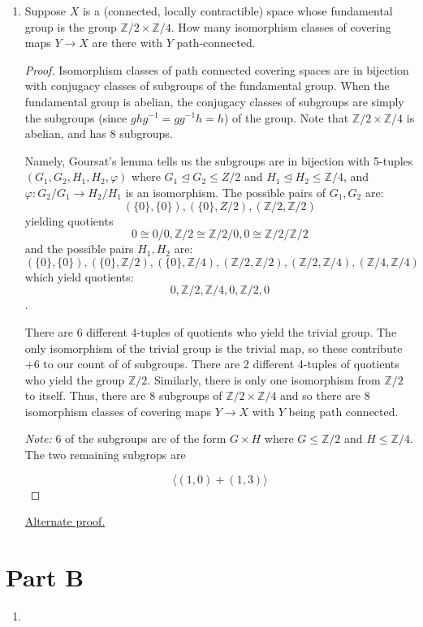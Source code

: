 \documentclass{article}
\newcommand{\Z}{\mathbb{Z}}
\begin{document}
\begin{enumerate}
\begin{proof}{(From \href{https://math.stackexchange.com/questions/202447/retraction-of-the-m\%C3\%B6bius-strip-to-its-boundary}{StackExchange})}
	If there were a retraction $r: M \rightarrow \partial M$, then the induced homomorphism $r_*$ on fundamental groups would satisfy $r_*\circ \iota_* (\alpha) = \alpha$. But $\iota_*(\alpha) = \beta^2$, so then $r_*(\beta^2) = r_*(\beta)^2 = \alpha$, or $r_*(\beta) = \sqrt{\alpha} \not \in \pi_1(\partial M)$.
	\end{proof}
	
	\item Suppose $X$ is a (connected, locally contractible) space whose fundamental group is the group $\mathbb{Z}/2 \times \mathbb{Z}/4.$
	How many isomorphism classes of covering maps $Y \rightarrow X$ are there with $Y$ path-connected.
	
	\begin{proof}
		Isomorphism classes of path connected covering spaces are in bijection with conjugacy classes of subgroups of the fundamental group. 
		When the fundamental group is abelian, the conjugacy classes of subgroups are simply 
		the subgroups (since $ghg^{-1} = gg^{-1} h=h$) of the group. 
		Note that $\mathbb{Z}/2 \times \mathbb{Z}/4$ is abelian, and has $8$ subgroups.
		
		Namely, Goursat's lemma tells us the subgroups are in bijection with 5-tuples $(G_1, G_2, H_1, H_2, \varphi)$
		where $G_1 \trianglelefteq G_2 \leq Z/2$ and $H_1 \trianglelefteq H_2 \leq \mathbb{Z}/4$, and $\varphi: G_2/G_1 \rightarrow H_2/H_1$
		is an isomorphism. The possible pairs of $G_1,G_2$ are:
		\[ ( \{0\},\{0\}), (\{0\}, Z/2), (\Z/2, \Z/2)\]
		yielding quotients
		\[ 0 \cong 0/0, \Z/2 \cong \Z/2 / 0, 0 \cong \Z/2 / \Z/2\]
		and the possible pairs $H_1,H_2$ are:
		\[ ( \{0\},\{0\}), (\{0\}, \Z/2), (\{0\}, \Z/4), (\Z/2, \Z/2),(\Z/2, \Z/4), (\Z/4, \Z/4) \]
		which yield quotients:
		\[ 0, \Z/2, \Z/4, 0, \Z/2, 0 \].
		
		There are 6 different 4-tuples of quotients who yield the trivial group. The only isomorphism of the trivial group is the trivial map, so
		these contribute +6 to our count of of subgroups.
		There are 2 different 4-tuples of quotients who yield the group $\Z/2$.
		Similarly, there is only one isomorphism from $\Z/2$ to itself.
		Thus, there are 8 subgroups of $\Z/2\times \Z/4$ and so there are 8 isomorphism classes of covering maps $Y \rightarrow X$ 
		with $Y$ being path connected.
		
		\emph{Note:} 6 of the subgroups are of the form $G \times H$ where $G \leq \Z/2$ and $H \leq \Z/4$.
		The two remaining subgrops are 
		
		\[ \langle (1,0) + (1,3) \rangle \]
	\end{proof}
	
	\href{https://math.stackexchange.com/questions/666840/what-are-the-subgroups-of-bbbz-2-times-bbbz-4}{Alternate proof.}
\end{enumerate}

\section*{Part B}
\begin{enumerate}
	\item	 
\end{enumerate}
\end{document}
